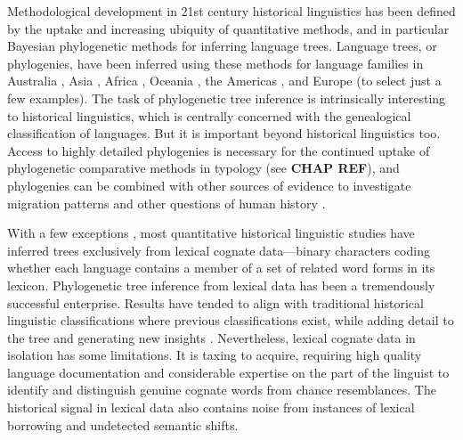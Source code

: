 Methodological development in 21st century historical linguistics has been defined by the uptake and increasing ubiquity of quantitative methods, and in particular Bayesian phylogenetic methods for inferring language trees. Language trees, or phylogenies, have been inferred using these methods for language families in Australia \autocite[Pama-Nyungan:][]{bowern_computational_2012}, Asia \autocites[Aslian:][]{dunn_aslian_2011}[Dravidian:][]{kolipakam_bayesian_2018}, Africa \autocite[Bantu:][]{whiteley_revising_2019}, Oceania \autocite[Austronesian:][]{gray_language_2009}, the Americas \autocites[Chapacuran:][]{birchall_combined_2016}[Tupí-Guaraní:][]{michael_bayesian_2015}, and Europe \autocites[Indo-European:][]{gray_language-tree_2003}{chang_ancestry-constrained_2015} (to select just a few examples). The task of phylogenetic tree inference is intrinsically interesting to historical linguistics, which is centrally concerned with the genealogical classification of languages. But it is important beyond historical linguistics too. Access to highly detailed phylogenies is necessary for the continued uptake of phylogenetic comparative methods in typology (see \textbf{CHAP REF}), and phylogenies can be combined with other sources of evidence to investigate migration patterns and other questions of human history \autocites[e.g.][]{hunley_genetic_2008}{bouckaert_mapping_2012}{malaspinas_genomic_2016}{bouckaert_origin_2018}.

With a few exceptions \autocites[e.g.][]{dunn_structural_2005}{dunn_structural_2008}, most quantitative historical linguistic studies have inferred trees exclusively from lexical cognate data---binary characters coding whether each language contains a member of a set of related word forms in its lexicon. Phylogenetic tree inference from lexical data has been a tremendously successful enterprise. Results have tended to align with traditional historical linguistic classifications where previous classifications exist, while adding detail to the tree and generating new insights \autocite[for example, the identification of major divisions within the Pama-Nyungan family, linking smaller, previously-identified subgroups, based on early phylogenetic splits inferred by][]{bowern_computational_2012}. Nevertheless, lexical cognate data in isolation has some limitations. It is taxing to acquire, requiring high quality language documentation and considerable expertise on the part of the linguist to identify and distinguish genuine cognate words from chance resemblances. The historical signal in lexical data also contains noise from instances of lexical borrowing and undetected semantic shifts.

